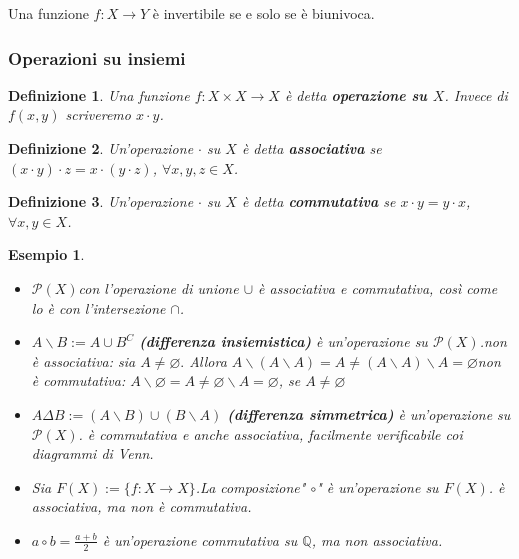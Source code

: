 \documentclass[a4paper,12pt]{article}
\theoremstyle{def}
\newtheorem*{definition}{Definizione}
\theoremstyle{prop}
\theoremstyle{esempio}
\newtheorem*{example}{Esempio}
\theoremstyle{dimostrazione}
\theoremstyle{teo}
\theoremstyle{osservazione}
\begin{document}
Una funzione \(f: X \rightarrow Y\) è invertibile se e solo se è biunivoca.

\subsubsection{Operazioni su insiemi}

\begin{definition}
	Una funzione \(f: X \times X \rightarrow X\) è detta \textbf{operazione su \(X\)}. Invece di \(f(x,y)\)
	scriveremo \(x \cdot y\).
\end{definition}

\begin{definition}
	Un'operazione \(\cdot\) su \(X\) è detta \textbf{associativa} se \((x \cdot y) \cdot z = x \cdot (y \cdot z)\),
	\(\forall x,y,z \in X\).
\end{definition}

\begin{definition}
	Un'operazione \(\cdot\) su \(X\) è detta \textbf{commutativa} se \(x \cdot y = y \cdot x\), \(\forall x,y \in X\).
\end{definition}

\begin{example}
	\
	\begin{itemize}
		\item \(\mathcal{P}(X) \)con l'operazione di unione \(\cup\) è associativa e commutativa, così come lo è con
		      l'intersezione \( \cap \).
		\item \(A \backslash B  := A \cup B^C\) \textbf{(differenza insiemistica)} è un'operazione su
		      \(\mathcal{P}(X)\).\newline non è associativa: sia \(A \neq \varnothing.\) Allora \(A \backslash (A \backslash A)
		      = A \neq (A\backslash A) \backslash A = \varnothing\)\newline non è commutativa: \(A \backslash \varnothing
		      = A \neq \varnothing \backslash A = \varnothing\), se \(A \neq \varnothing\)
		\item \(A \Delta B := (A \backslash B) \cup (B \backslash A)\) \textbf{(differenza simmetrica)}
		      è un'operazione su \(\mathcal{P}(X)\). \newline è commutativa e anche associativa, facilmente verificabile
		      coi diagrammi di Venn.
		\item Sia \(F(X) := \{f : X\rightarrow X\}\).\newline La composizione" \(\circ\)" è un'operazione su \(F(X)\).
		      \newline è associativa, ma non è commutativa.
		\item \(a \circ b = \frac{a + b}{2} \) è un'operazione commutativa su \(\mathbb{Q}\), ma non associativa.
	\end{itemize}
\end{example}
\end{document}
